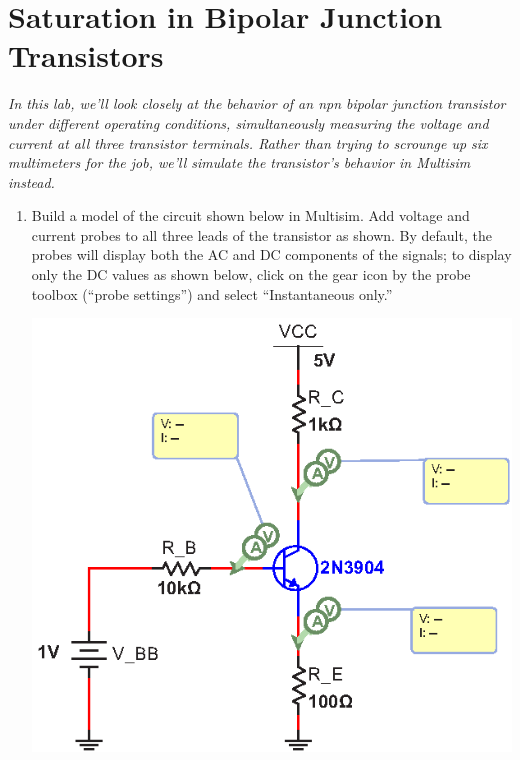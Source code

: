 \section{Saturation in  Bipolar Junction Transistors}
\label{lab_bjt_saturation}


\bigskip

\textit{In this lab, we'll look closely at the behavior of an npn bipolar junction transistor under different operating conditions, simultaneously measuring the voltage and current at all three transistor terminals.  Rather than trying to scrounge up six multimeters for the job, we'll simulate the transistor's behavior in Multisim instead.}

\begin{enumerate}[wide]

\item Build a model of the circuit shown below in Multisim.  Add voltage and current probes to all three leads of the transistor as shown.  By default, the probes will display both the AC and DC components of the signals; to display only the  DC values as shown below, click on the gear icon by the probe toolbox (``probe settings'') and select ``Instantaneous only.''  
\begin{center}
\includegraphics{bjt_saturation/bjt_saturation.eps}
\end{center}


\end{enumerate}

